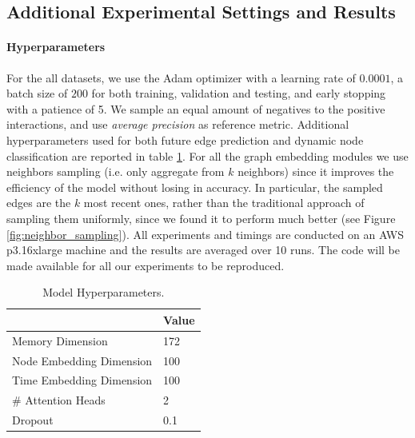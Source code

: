 \documentclass{article}
\begin{document}
\subsection{Additional Experimental Settings and Results} \label{sec:additional_exp_setting}

\paragraph{Hyperparameters}
For the all datasets, we use the Adam optimizer with a learning rate of $0.0001$, a batch size of $200$ for both training, validation and testing, and early stopping with a patience of 5. We sample an equal amount of negatives to the positive interactions, and use \textit{average precision} as reference metric. Additional hyperparameters used for both future edge prediction and dynamic node classification are reported in table \ref{tab:hyperparams}.
%
For all the graph embedding modules we use neighbors sampling \citep{hamilton2017representation} (i.e. only aggregate from $k$ neighbors) since it improves the efficiency of the model without losing in accuracy. In particular, the sampled edges are the $k$ most recent ones, rather than the traditional approach of sampling them uniformly, since we found it to perform much better (see Figure \ref{fig:neighbor_sampling}). All experiments and timings are conducted on an AWS p3.16xlarge machine and the results are averaged over 10 runs. The code will be made available for all our experiments to be reproduced.

  
  \begin{table}[h]
      \caption{Model Hyperparameters.}
      \label{tab:hyperparams}
      \centering
      \begin{tabular}{ll}
        \toprule
                                      & Value                 \\
        \midrule
        Memory Dimension            & 172                                  \\
        Node Embedding Dimension    & 100                                   \\
        Time Embedding Dimension    & 100                                   \\
        \# Attention Heads          & 2                        \\
        Dropout                     & 0.1                                \\
        \bottomrule
      \end{tabular}
    \end{table}
    
\end{document}
